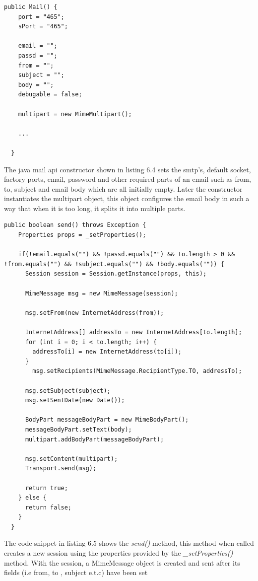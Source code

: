 \begin{lstlisting}[label=Mail-constructor,caption=Java Mail Api Constructor] 
public Mail() { 
    port = "465";
    sPort = "465"; 

    email = "";
    passd = ""; 
    from = ""; 
    subject = "";  
    body = ""; 
    debugable = false;  

    multipart = new MimeMultipart(); 
    
    ...
    
  }
\end{lstlisting}

The java mail api constructor shown in listing 6.4 sets the smtp's, default socket, factory ports, email, password and other required parts of an email such as from, to, subject and email body which are all initially empty. Later the constructor instantiates the multipart object, this object configures the email body in such a way that when it is too long, it splits it into multiple parts.
\newpage
\begin{lstlisting}[label=Mail-send,caption=Send Method] 
public boolean send() throws Exception { 
    Properties props = _setProperties(); 

    if(!email.equals("") && !passd.equals("") && to.length > 0 && !from.equals("") && !subject.equals("") && !body.equals("")) { 
      Session session = Session.getInstance(props, this); 

      MimeMessage msg = new MimeMessage(session); 

      msg.setFrom(new InternetAddress(from)); 

      InternetAddress[] addressTo = new InternetAddress[to.length]; 
      for (int i = 0; i < to.length; i++) { 
        addressTo[i] = new InternetAddress(to[i]); 
      } 
        msg.setRecipients(MimeMessage.RecipientType.TO, addressTo); 

      msg.setSubject(subject); 
      msg.setSentDate(new Date()); 

      BodyPart messageBodyPart = new MimeBodyPart(); 
      messageBodyPart.setText(body); 
      multipart.addBodyPart(messageBodyPart); 

      msg.setContent(multipart); 
      Transport.send(msg); 

      return true; 
    } else { 
      return false; 
    } 
  }
\end{lstlisting}

The code snippet in listing 6.5 shows the {\it send()} method, this method when called creates a new session using the properties provided by the {\it \_setProperties()} method. With the session, a MimeMessage object is created and sent after its fields (i.e from, to , subject e.t.c) have been set

